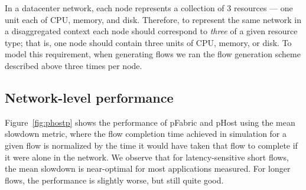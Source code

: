 In a \pdis datacenter network, each node represents a collection of 3 resources --- one unit each of CPU, memory, and disk. Therefore, to represent the same network in a disaggregated context each node should correspond to \emph{three} of a given resource type; that is, one node should contain three units of CPU, memory, or disk. To model this requirement, when generating flows we ran the flow generation scheme described above three times per node.


\subsection{Network-level performance}
Figure~\ref{fig:phostp} shows the performance of pFabric and pHost using the mean slowdown metric, where the flow completion time achieved in simulation for a given flow is normalized by the time it would have taken that flow to complete if it were alone in the network. We observe that for latency-sensitive short flows, the mean slowdown is near-optimal for most applications measured. For longer flows, the performance is slightly worse, but still quite good. 

